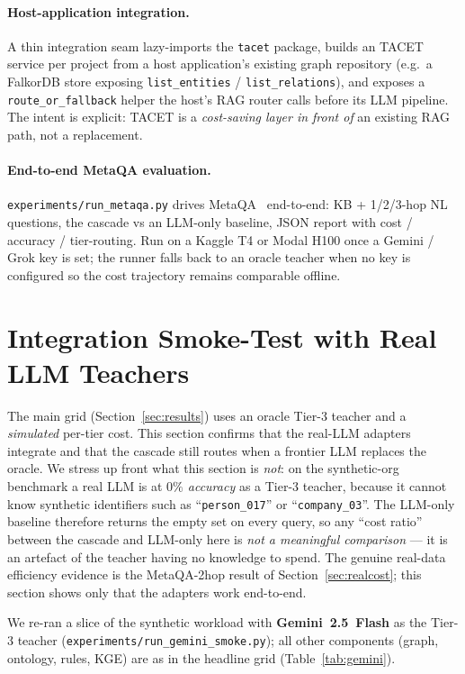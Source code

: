 \documentclass[11pt]{article}
\theoremstyle{plain}
\begin{document}
\paragraph{Host-application integration.}
A thin integration seam lazy-imports the \texttt{tacet} package, builds an
TACET service per project from a host application's existing graph
repository (e.g.\ a FalkorDB store exposing \texttt{list\_entities} /
\texttt{list\_relations}), and exposes a \texttt{route\_or\_fallback} helper
the host's RAG router calls before its LLM pipeline. The intent is explicit:
TACET is a \emph{cost-saving layer in front of} an existing RAG path,
not a replacement.

\paragraph{End-to-end MetaQA evaluation.}
\texttt{experiments/run\_metaqa.py} drives MetaQA~\citep{zhang2018metaqa}
end-to-end: KB + 1/2/3-hop NL questions, the cascade vs an LLM-only
baseline, JSON report with cost / accuracy / tier-routing. Run on a
Kaggle T4 or Modal H100 once a Gemini / Grok key is set; the runner
falls back to an oracle teacher when no key is configured so the cost
trajectory remains comparable offline.

\section{Integration Smoke-Test with Real LLM Teachers}
\label{sec:smoketest}

The main grid (Section~\ref{sec:results}) uses an oracle Tier-3 teacher and a
\emph{simulated} per-tier cost. This section confirms that the real-LLM
adapters integrate and that the cascade still routes when a frontier LLM
replaces the oracle. We stress up front what this section is \emph{not}: on the
synthetic-org benchmark a real LLM is at \emph{$0\%$ accuracy} as a Tier-3
teacher, because it cannot know synthetic identifiers such as
``\texttt{person\_017}'' or ``\texttt{company\_03}''. The LLM-only baseline
therefore returns the empty set on every query, so any ``cost ratio'' between
the cascade and LLM-only here is \emph{not a meaningful comparison} --- it is an
artefact of the teacher having no knowledge to spend. The genuine real-data
efficiency evidence is the MetaQA-2hop result of Section~\ref{sec:realcost};
this section shows only that the adapters work end-to-end.

We re-ran a slice of the synthetic workload with \textbf{Gemini~2.5~Flash} as
the Tier-3 teacher (\texttt{experiments/run\_gemini\_smoke.py}); all other
components (graph, ontology, rules, KGE) are as in the headline grid
(Table~\ref{tab:gemini}).
\end{document}
